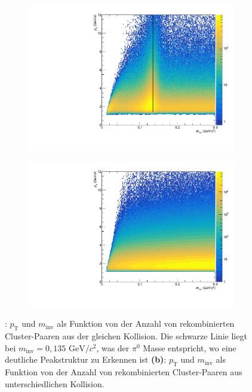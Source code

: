 \begin{figure}[tbp] \label{figInvMassPt}
\centering
\begin{subfigure}{.5\textwidth}
	\centering
	\includegraphics[width=.95\linewidth]{hInvMass_pT_Signal.pdf}
	\caption{}
	\label{figInvMassPt_a}
\end{subfigure}%
	\begin{subfigure}{.5\textwidth}
	\centering
	\includegraphics[width=.95\linewidth]{hInvMass_pT_Bkg.pdf}
	\caption{}
	\label{figInvMassPt_b}
\end{subfigure}
\caption{: $p_\text{T}$ und $m_\text{inv}$ als Funktion von der Anzahl von rekombinierten  Cluster-Paaren aus der gleichen Kollision.
Die schwarze Linie liegt bei $m_{\text{inv}}=0,135\text{ GeV/}c^{2}$, was der $\pi^{0}$ Masse entspricht, wo eine deutliche Peakstruktur zu Erkennen ist
\newline
{\bf (b)}: $p_\text{T}$ und $m_\text{inv}$ als Funktion von der Anzahl von rekombinierten  Cluster-Paaren aus unterschiedlichen Kollision.}
\end{figure}
